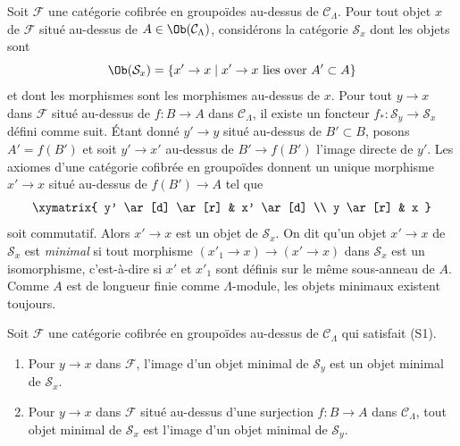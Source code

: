 \medskip\noindent
Soit $\mathcal{F}$ une catégorie cofibrée en groupoïdes au-dessus de
$\mathcal{C}_\Lambda$. Pour tout objet $x$ de $\mathcal{F}$ situé au-dessus
de $A \in \Ob(\mathcal{C}_\Lambda)$, considérons la catégorie
$\mathcal{S}_x$ dont les objets sont
$$
\Ob(\mathcal{S}_x) =
\{x' \to x \mid x' \to x\text{ lies over }A' \subset A\}
$$
et dont les morphismes sont les morphismes au-dessus de $x$. Pour tout
$y \to x$ dans $\mathcal{F}$ situé au-dessus de $f : B \to A$ dans
$\mathcal{C}_\Lambda$, il existe un foncteur
$f_* : \mathcal{S}_y \to \mathcal{S}_x$ défini comme suit. Étant donné
$y' \to y$ situé au-dessus de $B' \subset B$, posons $A' = f(B')$ et soit
$y' \to x'$ au-dessus de $B' \to f(B')$ l'image directe de $y'$. Les axiomes
d'une catégorie cofibrée en groupoïdes donnent un unique morphisme
$x' \to x$ situé au-dessus de $f(B') \to A$ tel que
$$
\xymatrix{
y' \ar[d] \ar[r] & x' \ar[d] \\
y \ar[r] & x
}
$$
soit commutatif. Alors $x' \to x$ est un objet de $\mathcal{S}_x$. On dit
qu'un objet $x' \to x$ de $\mathcal{S}_x$ est {\it minimal} si tout morphisme
$(x'_1 \to x) \to (x' \to x)$ dans $\mathcal{S}_x$ est un isomorphisme,
c'est-à-dire si $x'$ et $x'_1$ sont définis sur le même sous-anneau de $A$.
Comme $A$ est de longueur finie comme $\Lambda$-module, les objets minimaux
existent toujours.

\begin{lemma}
\label{lemma-smallest-where-descends}
Soit $\mathcal{F}$ une catégorie cofibrée en groupoïdes au-dessus de
$\mathcal{C}_\Lambda$ qui satisfait (S1).
\begin{enumerate}
\item Pour $y \to x$ dans $\mathcal{F}$, l'image d'un objet minimal de
$\mathcal{S}_y$ est un objet minimal de $\mathcal{S}_x$.
\item Pour $y \to x$ dans $\mathcal{F}$ situé au-dessus d'une surjection
$f : B \to A$ dans $\mathcal{C}_\Lambda$, tout objet minimal de
$\mathcal{S}_x$ est l'image d'un objet minimal de $\mathcal{S}_y$.
\end{enumerate}
\end{lemma}


